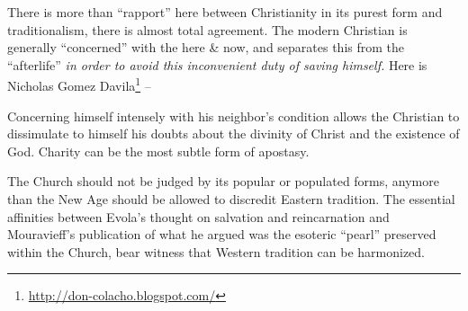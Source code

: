 There is more than ``rapport'' here between Christianity in its purest form and traditionalism, there is almost total agreement. The modern Christian is generally ``concerned'' with the here \& now, and separates this from the ``afterlife'' \emph{in order to avoid this inconvenient duty of saving himself.} Here is Nicholas Gomez Davila\footnote{\url{http://don-colacho.blogspot.com/}} --

\begin{quotex}
Concerning himself intensely with his neighbor's condition allows the Christian to dissimulate to himself his doubts about the divinity of Christ and the existence of God. Charity can be the most subtle form of apostasy.
\end{quotex}


The Church should not be judged by its popular or populated forms, anymore than the New Age should be allowed to discredit Eastern tradition. The essential affinities between Evola's thought on salvation and reincarnation and Mouravieff's publication of what he argued was the esoteric ``pearl'' preserved within the Church, bear witness that Western tradition can be harmonized.


